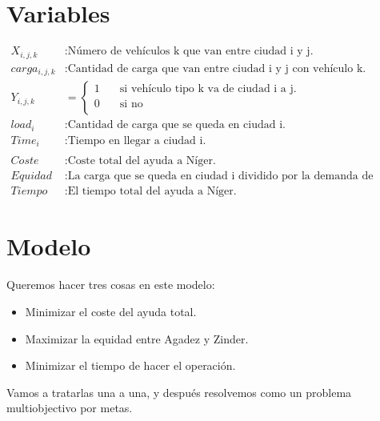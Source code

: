 \documentclass[]{article}
\begin{document}
\section{Variables}
\begin{align*}
		X_{i,j,k} &: \text{Número de vehículos k que van entre ciudad i y j.}\\
		carga_{i,j,k} &: \text{Cantidad de carga que van entre ciudad i y j con vehículo k.}\\
		Y_{i,j,k} &=
		\begin{cases}
		1 & \quad \text{si vehículo tipo k va de ciudad i a j.} \\
		0 & \quad \text{si no}\\
		\end{cases}\\
		load_i &: \text{Cantidad de carga que se queda en ciudad i.}\\
		Time_i &: \text{Tiempo en llegar a ciudad i.}\\ \\
		Coste &: \text{Coste total del ayuda a Níger.}\\
		Equidad &: \text{La carga que se queda en ciudad i dividido por la demanda de ciudad i.}\\
		Tiempo &: \text{El tiempo total del ayuda a Níger.}
\end{align*}

\section{Modelo}
Queremos hacer tres cosas en este modelo:
\begin{itemize}
	\item Minimizar el coste del ayuda total.
	\item Maximizar la equidad entre Agadez y Zinder.
	\item Minimizar el tiempo de hacer el operación.
\end{itemize}
Vamos a tratarlas una a una, y después resolvemos como un problema multiobjectivo por metas.
\end{document}
